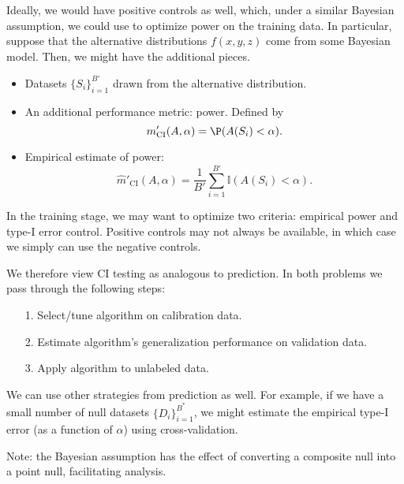 \documentclass[12pt]{article}
\begin{document}
Ideally, we would have positive controls as well, which, under a similar Bayesian assumption, we could use to optimize power on the training data. In particular, suppose that the alternative distributions $f(x,y,z)$ come from some Bayesian model. Then, we might have the additional pieces.
\begin{itemize}
\item Datasets $\{S_i\}_{i=1}^{B'}$ drawn from the alternative distribution.
\item An additional performance metric: power. Defined by
$$m'_\textrm{CI}(A, \alpha) = \P(A(S_i) < \alpha).$$
\item Empirical estimate of power:
$$\hat{m}'_{\textrm{CI}}(A, \alpha) = \frac{1}{B'} \sum_{i=1}^{B'} \mathbb{I}\left( A(S_i) < \alpha \right).$$
\end{itemize}
In the training stage, we may want to optimize two criteria: empirical power and type-I error control. Positive controls may not always be available, in which case we simply can use the negative controls.

We therefore view CI testing as analogous to prediction. In both problems we pass through the following steps:
\begin{itemize}
\item[1.] Select/tune algorithm on calibration data.
\item[2.] Estimate algorithm's generalization performance on validation data.
\item[3.] Apply algorithm to unlabeled data. 
\end{itemize}
We can use other strategies from prediction as well. For example, if we have a small number of null datasets $\{D_i\}_{i=1}^{B^*}$, we might estimate the empirical type-I error (as a function of $\alpha$) using cross-validation.

Note: the Bayesian assumption has the effect of converting a composite null into a point null, facilitating analysis.



\end{document}
